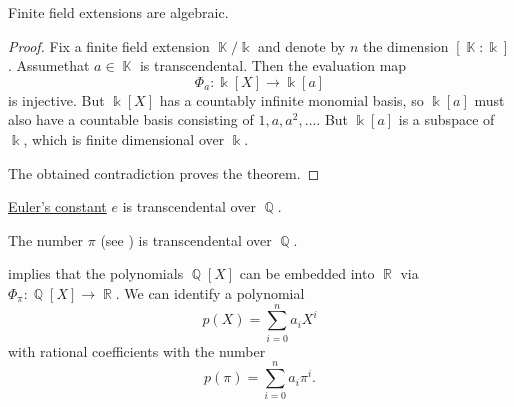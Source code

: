 \begin{proposition}\label{thm:finite_field_extensions_are_algebraic}
  Finite field extensions are algebraic.
\end{proposition}
\begin{proof}
  Fix a finite field extension \( \BbbK / \Bbbk \) and denote by \( n \) the dimension \( [\BbbK : \Bbbk] \). Assume\LEM that \( a \in \BbbK \) is transcendental. Then the evaluation map
  \begin{equation*}
    \Phi_a: \Bbbk[X] \to \Bbbk[a]
  \end{equation*}
  is injective. But \( \Bbbk[X] \) has a countably infinite monomial basis, so \( \Bbbk[a] \) must also have a countable basis consisting of \( 1, a, a^2, \ldots \). But \( \Bbbk[a] \) is a subspace of \( \Bbbk \), which is finite dimensional over \( \Bbbk \).

  The obtained contradiction proves the theorem.
\end{proof}

\begin{theorem}\label{thm:e_is_transcendental}\label{thm:eulers_constant_is_transcendental}
  \hyperref[def:exponential_function]{Euler's constant} \( e \) is transcendental over \( \BbbQ \).
\end{theorem}

\begin{theorem}\label{thm:pi_is_transcendental}\mcite\cite[454]{Knapp2016BasicAlgebra}
  The number \( \pi \) (see ) is transcendental over \( \BbbQ \).
\end{theorem}

\begin{example}\label{ex:polynomials_over_pi}
   implies that the polynomials \( \BbbQ[X] \) can be embedded into \( \BbbR \) via \( \Phi_\pi: \BbbQ[X] \to \BbbR \). We can identify a polynomial
  \begin{equation*}
    p(X) = \sum_{i=0}^n a_i X^i
  \end{equation*}
  with rational coefficients with the number
  \begin{equation*}
    p(\pi) = \sum_{i=0}^n a_i \pi^i.
  \end{equation*}
\end{example}


